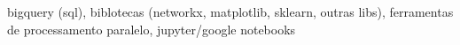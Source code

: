 
bigquery (sql), biblotecas (networkx, matplotlib, sklearn, outras libs), ferramentas de processamento paralelo, jupyter/google notebooks
